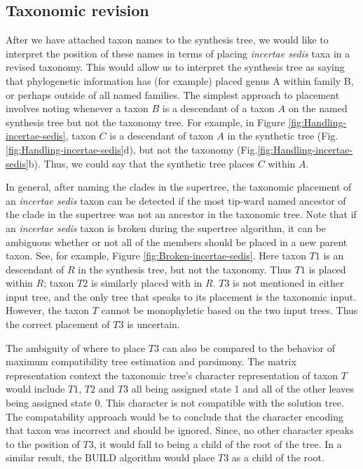 \documentclass[english]{article}
\begin{document}
\subsection{Taxonomic revision}\label{subsec:Placement}

After we have attached taxon names to the synthesis tree, we would
like to interpret the position of these names in terms of placing
\emph{incertae sedis }taxa in a revised taxonomy.
This would allow us
to interpret the synthesis tree as saying that phylogenetic
information has (for example) placed genus A within family B, or
perhaps outside of all named families.
The simplest approach to
placement involves noting whenever a taxon $B$ is a descendant of a
taxon $A$ on the named synthesis tree but not the taxonomy tree.
For
example, in Figure \ref{fig:Handling-incertae-sedis}, taxon $C$ is a
descendant of taxon $A$ in the synthetic tree 
(Fig.\ref{fig:Handling-incertae-sedis}d), but not the taxonomy 
(Fig.\ref{fig:Handling-incertae-sedis}b).
Thus, we could say that the synthetic tree places
$C$ within $A$. 

In general, after naming the clades in the supertree, the
    taxonomic placement of an \emph{incertae sedis} taxon
    can be detected if the most tip-ward named ancestor of
    the clade in the supertree was not an ancestor in the
    taxonomic tree.
Note that if an \emph{incertae sedis} taxon is broken
    during the supertree algorithm, it can be ambiguous whether
    or not all of the members should be placed in a new
    parent taxon.
See, for example, Figure \ref{fig:Broken-incertae-sedis}.
Here taxon $T1$ is an descendant of $R$ in the
synthesis tree, but not the taxonomy.
Thus $T1$ is placed within $R$; taxon
 $T2$ is similarly placed with in $R$.
$T3$ is not mentioned in either input tree, and the 
    only tree that speaks to its placement is the taxonomic input.
However, the taxon $T$ cannot be monophyletic based on the
     two input trees.
Thus the correct placement of $T3$ is uncertain.

The ambiguity of where to place $T3$ can also be compared to the
    behavior of maximum compatibility tree estimation and parsimony.
The matrix representation context the taxonomic tree's
    character representation of taxon $T$ would include $T1$, $T2$ and $T3$
    all being assigned state 1 and all of the other leaves being assigned 
    state 0.
This character is not compatible with the solution tree. 
The compatability approach would be to conclude that the character encoding 
    that taxon was incorrect and should be ignored.
Since, no other character speaks to the position of $T3$, it would fall to being
    a child of the root of the tree.
In a similar result, the BUILD algorithm would place $T3$ as a child of the root.
\end{document}
